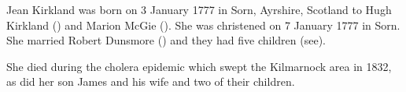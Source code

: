 
Jean Kirkland was born on 3 January 1777 in	Sorn, Ayrshire, Scotland \cite{JKirklandBirth} to Hugh Kirkland () and Marion McGie (). She was christened on 7 January 1777 in Sorn.
She married Robert Dunsmore () and they had five children (see). 

She died during the cholera epidemic which swept the Kilmarnock area in 1832, as did her son James and his wife and two of their children.\cite{DRDunsmoreDeath}


